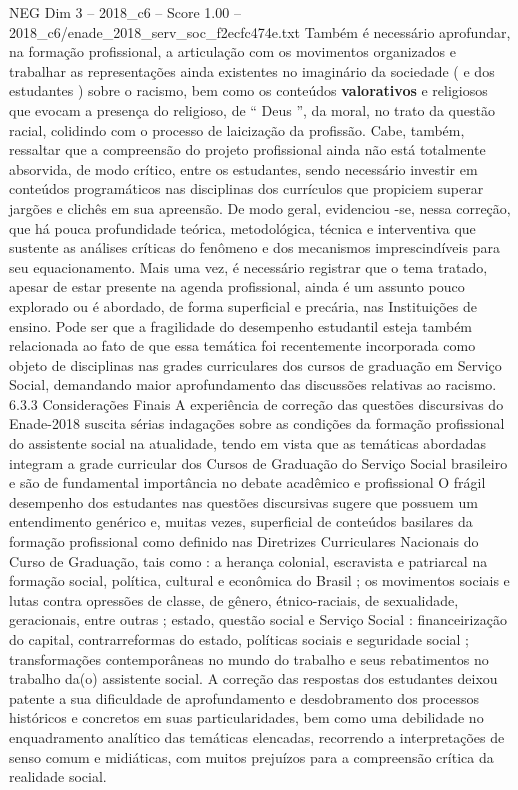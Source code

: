 \begin{textsample}{NEG Dim 3 – 2018\_c6 – Score 1.00 – 2018\_c6/enade\_2018\_serv\_soc\_f2ecfc474e.txt}
Também é necessário aprofundar, na formação profissional, a articulação com os movimentos organizados e trabalhar as representações ainda existentes no imaginário da sociedade ( e dos estudantes ) sobre o racismo, bem como os conteúdos \textbf{valorativos} e religiosos que evocam a presença do religioso, de “ Deus ”, da moral, no trato da questão racial, colidindo com o processo de laicização da profissão.
Cabe, também, ressaltar que a compreensão do projeto profissional ainda não está totalmente absorvida, de modo crítico, entre os estudantes, sendo necessário investir em conteúdos programáticos nas disciplinas dos currículos que propiciem superar jargões e clichês em sua apreensão.
De modo geral, evidenciou -se, nessa correção, que há pouca profundidade teórica, metodológica, técnica e interventiva que sustente as análises críticas do fenômeno e dos mecanismos imprescindíveis para seu equacionamento.
Mais uma vez, é necessário registrar que o tema tratado, apesar de estar presente na agenda profissional, ainda é um assunto pouco explorado ou é abordado, de forma superficial e precária, nas Instituições de ensino.
Pode ser que a fragilidade do desempenho estudantil esteja também relacionada ao fato de que essa temática foi recentemente incorporada como objeto de disciplinas nas grades curriculares dos cursos de graduação em Serviço Social, demandando maior aprofundamento das discussões relativas ao racismo. 6.3.3 Considerações Finais A experiência de correção das questões discursivas do Enade-2018 suscita sérias indagações sobre as condições da formação profissional do assistente social na atualidade, tendo em vista que as temáticas abordadas integram a grade curricular dos Cursos de Graduação do Serviço Social brasileiro e são de fundamental importância no debate acadêmico e profissional O frágil desempenho dos estudantes nas questões discursivas sugere que possuem um entendimento genérico e, muitas vezes, superficial de conteúdos basilares da formação profissional como definido nas Diretrizes Curriculares Nacionais do Curso de Graduação, tais como : a herança colonial, escravista e patriarcal na formação social, política, cultural e econômica do Brasil ; os movimentos sociais e lutas contra opressões de classe, de gênero, étnico-raciais, de sexualidade, geracionais, entre outras ; estado, questão social e Serviço Social : financeirização do capital, contrarreformas do estado, políticas sociais e seguridade social ; transformações contemporâneas no mundo do trabalho e seus rebatimentos no trabalho da(o) assistente social.
A correção das respostas dos estudantes deixou patente a sua dificuldade de aprofundamento e desdobramento dos processos históricos e concretos em suas particularidades, bem como uma debilidade no enquadramento analítico das temáticas elencadas, recorrendo a interpretações de senso comum e midiáticas, com muitos prejuízos para a compreensão crítica da realidade social.

\end{textsample}
